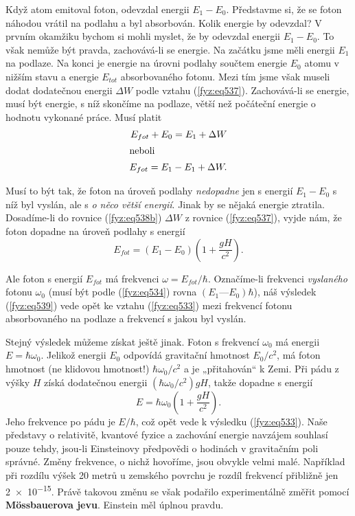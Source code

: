     Když atom emitoval foton, odevzdal energii \(E_1 - E_0\). Představme si, že se foton náhodou 
    vrátil na podlahu a byl absorbován. Kolik energie by odevzdal? V prvním okamžiku bychom si 
    mohli myslet, že by odevzdal energii \(E_1 - E_0\). To však nemůže být pravda, zachovává-li se 
    energie. Na začátku jsme měli energii \(E_1\) na podlaze. Na konci je energie na úrovni podlahy 
    součtem energie \(E_0\) atomu v nižším stavu a energie \(E_{tot}\) absorbovaného fotonu. Mezi 
    tím jsme však museli dodat dodatečnou energii \(\Delta W\) podle vztahu (\ref{fyz:eq537}). 
    Zachovává-li se energie, musí být energie, s níž skončíme na podlaze, větší než počáteční 
    energie o hodnotu vykonané práce. Musí platit
    \begin{subequations}
      \begin{align}
        E_{fot} + E_0 = E_1 + \Delta W       \label{fyz:eq538a}  \\
        \shortintertext{neboli}
        E_{fot} = E_1 - E_1 + \Delta W.      \label{fyz:eq538b}
      \end{align}
    \end{subequations}

    Musí to být tak, že foton na úroveň podlahy \emph{nedopadne} jen s energií \(E_1 - E_0\) s níž 
    byl vyslán, ale s \emph{o něco větší energií}. Jinak by se nějaká energie ztratila. Dosadíme-li 
    do rovnice (\ref{fyz:eq538b}) \(\Delta W\) z rovnice (\ref{fyz:eq537}), vyjde nám, že foton 
    dopadne na úroveň podlahy s energií
    \begin{equation}\label{fyz:eq539}
      E_{fot} = (E_1-E_0)\left(1 + \dfrac{gH}{c^2}\right).
    \end{equation}
    
    Ale foton s energií \(E_{fot}\) má frekvenci \(\omega = E_{fot}/\hbar\). Označíme-li frekvenci 
    \emph{vyslaného} fotonu \(\omega_0\) (musí být podle (\ref{fyz:eq534}) rovna \((E_1 — 
    E_0)\hbar\)), náš výsledek (\ref{fyz:eq539}) vede opět ke vztahu (\ref{fyz:eq533}) mezi 
    frekvencí fotonu absorbovaného na podlaze a frekvencí s jakou byl vyslán.
    
    Stejný výsledek můžeme získat ještě jinak. Foton s frekvencí \(\omega_0\) má energii \(E = 
    \hbar\omega_0\). Jelikož energii \(E_0\) odpovídá gravitační hmotnost \(E_0/c^2\), má foton 
    hmotnost (ne klidovou hmotnost!) \(\hbar\omega_0/c^2\) a je „přitahován“ k Zemi. Při pádu z 
    výšky \(H\) získá  dodatečnou energii \((\hbar\omega_0/c^2)gH\), takže dopadne s energií
    \begin{equation*}
      E = \hbar\omega_0\left(1 + \dfrac{gH}{c^2}\right).
    \end{equation*}
    Jeho frekvence po pádu je \(E/\hbar\), což opět vede k výsledku (\ref{fyz:eq533}). Naše 
    představy o relativitě, kvantové fyzice a zachování energie navzájem souhlasí pouze tehdy, 
    jsou-li Einsteinovy předpovědi o hodinách v gravitačním poli správné. Změny frekvence, o nichž 
    hovoříme, jsou obvykle velmi malé. Například při rozdílu výšek \num{20} metrů u zemského 
    povrchu je rozdíl frekvencí přibližně jen \num{2e-15}. Právě takovou změnu se však podařilo 
    experimentálně změřit pomocí \textbf{Mössbauerova jevu}. Einstein měl úplnou pravdu.
    
